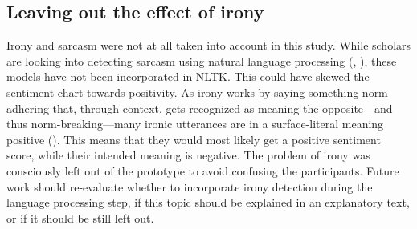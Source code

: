 \subsection*{Leaving out the effect of irony}
Irony and sarcasm were not at all taken into account in this study. While scholars are looking into detecting sarcasm using natural language processing (\cite{reyesMultidimensionalApproachDetecting2013}, \cite{barbieriModellingIronyTwitter2014}), these models have not been incorporated in NLTK. This could have skewed the sentiment chart towards positivity. As irony works by saying something norm-adhering that, through context, gets recognized as meaning the opposite---and thus norm-breaking---many ironic utterances are in a surface-literal meaning positive (\cite{gioraIronyNegation1995}). This means that they would most likely get a positive sentiment score, while their intended meaning is negative. The problem of irony was consciously left out of the prototype to avoid confusing the participants. Future work should re-evaluate whether to incorporate irony detection during the language processing step, if this topic should be explained in an explanatory text, or if it should be still left out.
